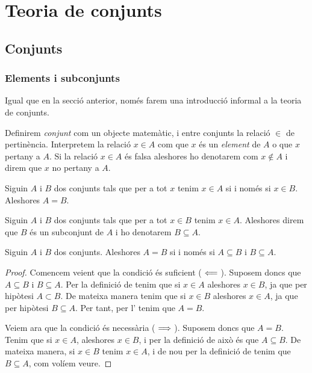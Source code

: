 \documentclass[../Apunts.tex]{subfiles}
\begin{document}
	\chapter{Teoria de conjunts}
	\section{Conjunts}
	\subsection{Elements i subconjunts}
	Igual que en la secció anterior, només farem una introducció informal a la teoria de conjunts.
	
	Definirem \emph{conjunt} com un objecte matemàtic, i entre conjunts la relació \(\in\) de pertinència. Interpretem la relació \(x\in A\) com que \(x\) és un \emph{element} de \(A\) o que \(x\) pertany a \(A\). Si la relació \(x\in A\) és falsa aleshores ho denotarem com \(x\notin A\) i direm que \(x\) no pertany a \(A\).
	\begin{axiom}
		\label{axiom:axioma d'extensionalitat}
		Siguin \(A\) i \(B\) dos conjunts tals que per a tot \(x\) tenim \(x\in A\) si i només si \(x\in B\). Aleshores \(A=B\).
	\end{axiom}
	\begin{definition}[Subconjunt]
		\label{def:subconjunt}
		Siguin \(A\) i \(B\) dos conjunts tals que per a tot \(x\in B\) tenim \(x\in A\). Aleshores direm que \(B\) és un subconjunt de \(A\) i ho denotarem \(B\subseteq A\).
	\end{definition}
	\begin{theorem}
		\label{thm:doble inclusió}
		Siguin \(A\) i \(B\) dos conjunts. Aleshores \(A=B\) si i només si \(A\subseteq B\) i \(B\subseteq A\).
		\begin{proof}
			Comencem veient que la condició és suficient (\(\impliedby\)). Suposem doncs que \(A\subseteq B\) i \(B\subseteq A\). Per la definició de  tenim que si \(x\in A\) aleshores \(x\in B\), ja que per hipòtesi \(A\subset B\). De mateixa manera tenim que si \(x\in B\) aleshores \(x\in A\), ja que per hipòtesi \(B\subseteq A\). Per tant, per l' tenim que \(A=B\).
			
			Veiem ara que la condició és necessària (\(\implies\)). Suposem doncs que \(A=B\). Tenim que si \(x\in A\), aleshores \(x\in B\), i per la definició de  això és que \(A\subseteq B\). De mateixa manera, si \(x\in B\) tenim \(x\in A\), i de nou per la definició de  tenim que \(B\subseteq A\), com volíem veure.
		\end{proof}
	\end{theorem}
\end{document}
